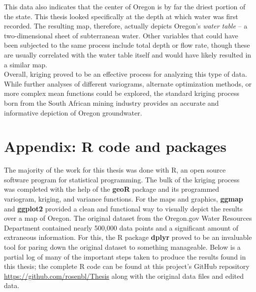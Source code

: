 \documentclass[12pt,twoside]{reedthesis}
\begin{document}
This data also indicates that the center of Oregon is by far the driest portion of the state. This thesis looked specifically at the depth at which water was first recorded. The resulting map, therefore, actually depicts Oregon's \emph{water table} -- a two-dimensional sheet of subterranean water. Other variables that could have been subjected to the same process include total depth or flow rate, though these are usually correlated with the water table itself and would have likely resulted in a similar map. \\

Overall, kriging proved to be an effective process for analyzing this type of data. While further analyses of different variograms, alternate optimization methods, or more complex mean functions could be explored, the standard kriging process born from the South African mining industry provides an accurate and informative depiction of Oregon groundwater.


    \appendix
      
     \chapter*{Appendix: R code and packages}


The majority of the work for this thesis was done with R, an open source software program for statistical programming. The bulk of the kriging process was completed with the help of the \textbf{geoR} package \cite{geoR} and its programmed variogram, kriging, and variance functions. For the maps and graphics, \textbf{ggmap} \cite{ggmap} and \textbf{ggplot2} \cite{ggplot2} provided a clean and functional way to visually depict the results over a map of Oregon. The original dataset from the Oregon.gov Water Resources Department contained nearly 500,000 data points and a significant amount of extraneous information. For this, the R package \textbf{dplyr} \cite{dplyr} proved to be an invaluable tool for paring down the original dataset to something manageable. Below is a partial log of many of the important steps taken to produce the results found in this thesis; the complete R code can be found at this project's GitHub repository \url{https://github.com/rosenbl/Thesis} along with the original data files and edited data. \\
\end{document}
